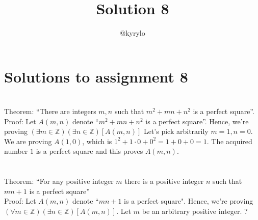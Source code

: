 \documentclass{article}
\title{Solution 8}
\author{@kyrylo}
\begin{document}
\section*{Solutions to assignment 8}

\section{}

Theorem: ``There are integers $m, n$ such that $m^2 + mn + n^2$ is a perfect
square''.
\\
Proof: Let $A(m, n)$ denote ``$m^2 + mn + n^2$ is a perfect square''.
Hence, we're proving $(\exists m \in \mathbb{Z})(\exists n \in \mathbb{Z})[A(m, n)]$
Let's pick arbitrarily $m = 1, n = 0$. We are proving $A(1, 0)$, which is
$1^2 + 1 \cdot 0 + 0^2 = 1 + 0 + 0 = 1$. The acquired number $1$ is a perfect square and this
proves $A(m, n)$.

\section{}

Theorem: ``For any positive integer $m$ there is a positive integer $n$ such
that $mn + 1$ is a perfect square''
\\
Proof: Let $A(m, n)$ denote ``$mn + 1$ is a perfect square". Hence, we're
proving $(\forall m \in \mathbb{Z})(\exists n \in \mathbb{Z})[A(m, n)]$. Let $m$
be an arbitrary positive integer. ?
\end{document}
